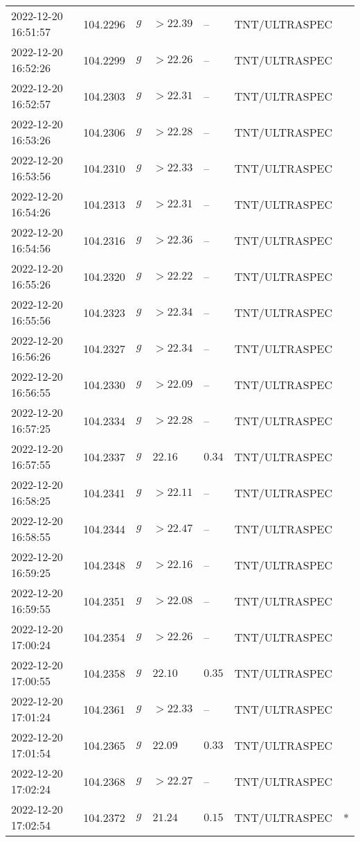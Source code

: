 \documentclass{nature_plusfigure}
\begin{document}
\begin{supplement}
\begin{center}
\begin{longtable}{lllllll}
2022-12-20 16:51:57 & 104.2296 & $g$ & $>22.39$ & -- & TNT/ULTRASPEC &  \\ 
2022-12-20 16:52:26 & 104.2299 & $g$ & $>22.26$ & -- & TNT/ULTRASPEC &  \\ 
2022-12-20 16:52:57 & 104.2303 & $g$ & $>22.31$ & -- & TNT/ULTRASPEC &  \\ 
2022-12-20 16:53:26 & 104.2306 & $g$ & $>22.28$ & -- & TNT/ULTRASPEC &  \\ 
2022-12-20 16:53:56 & 104.2310 & $g$ & $>22.33$ & -- & TNT/ULTRASPEC &  \\ 
2022-12-20 16:54:26 & 104.2313 & $g$ & $>22.31$ & -- & TNT/ULTRASPEC &  \\ 
2022-12-20 16:54:56 & 104.2316 & $g$ & $>22.36$ & -- & TNT/ULTRASPEC &  \\ 
2022-12-20 16:55:26 & 104.2320 & $g$ & $>22.22$ & -- & TNT/ULTRASPEC &  \\ 
2022-12-20 16:55:56 & 104.2323 & $g$ & $>22.34$ & -- & TNT/ULTRASPEC &  \\ 
2022-12-20 16:56:26 & 104.2327 & $g$ & $>22.34$ & -- & TNT/ULTRASPEC &  \\ 
2022-12-20 16:56:55 & 104.2330 & $g$ & $>22.09$ & -- & TNT/ULTRASPEC &  \\ 
2022-12-20 16:57:25 & 104.2334 & $g$ & $>22.28$ & -- & TNT/ULTRASPEC &  \\ 
2022-12-20 16:57:55 & 104.2337 & $g$ & $22.16$ & $0.34$ & TNT/ULTRASPEC &  \\ 
2022-12-20 16:58:25 & 104.2341 & $g$ & $>22.11$ & -- & TNT/ULTRASPEC &  \\ 
2022-12-20 16:58:55 & 104.2344 & $g$ & $>22.47$ & -- & TNT/ULTRASPEC &  \\ 
2022-12-20 16:59:25 & 104.2348 & $g$ & $>22.16$ & -- & TNT/ULTRASPEC &  \\ 
2022-12-20 16:59:55 & 104.2351 & $g$ & $>22.08$ & -- & TNT/ULTRASPEC &  \\ 
2022-12-20 17:00:24 & 104.2354 & $g$ & $>22.26$ & -- & TNT/ULTRASPEC &  \\ 
2022-12-20 17:00:55 & 104.2358 & $g$ & $22.10$ & $0.35$ & TNT/ULTRASPEC &  \\ 
2022-12-20 17:01:24 & 104.2361 & $g$ & $>22.33$ & -- & TNT/ULTRASPEC &  \\ 
2022-12-20 17:01:54 & 104.2365 & $g$ & $22.09$ & $0.33$ & TNT/ULTRASPEC &  \\ 
2022-12-20 17:02:24 & 104.2368 & $g$ & $>22.27$ & -- & TNT/ULTRASPEC &  \\ 
2022-12-20 17:02:54 & 104.2372 & $g$ & $21.24$ & $0.15$ & TNT/ULTRASPEC & * \\ 

\end{longtable}
\end{center}
\end{supplement}
\end{document}
